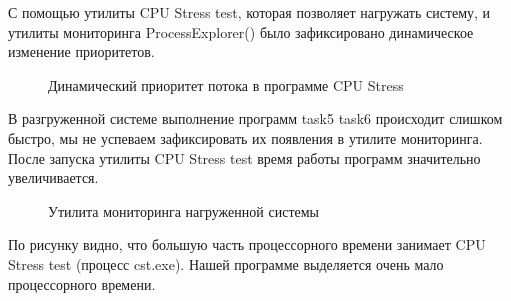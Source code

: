 \documentclass[a4paper]{article}
\begin{document}
	С помощью утилиты CPU Stress test, которая позволяет нагружать систему, и утилиты мониторинга ProcessExplorer() было зафиксировано динамическое изменение приоритетов. 
	\begin{figure}[h!]
		\caption{Динамический приоритет потока в программе CPU Stress}
		\label{img:dyn_cha}
	\end{figure}
	В разгруженной системе выполнение программ task5 task6 происходит слишком быстро, мы не успеваем зафиксировать их появления в утилите мониторинга. После запуска утилиты CPU Stress test время работы программ значительно увеличивается.
	\begin{figure}[h!]
		\caption{Утилита мониторинга нагруженной системы}
		\label{img:cpu_test}
	\end{figure}
	
	По рисунку видно, что большую часть процессорного времени занимает CPU Stress test (процесс cst.exe). Нашей программе выделяется очень мало процессорного времени.\\
\end{document}
